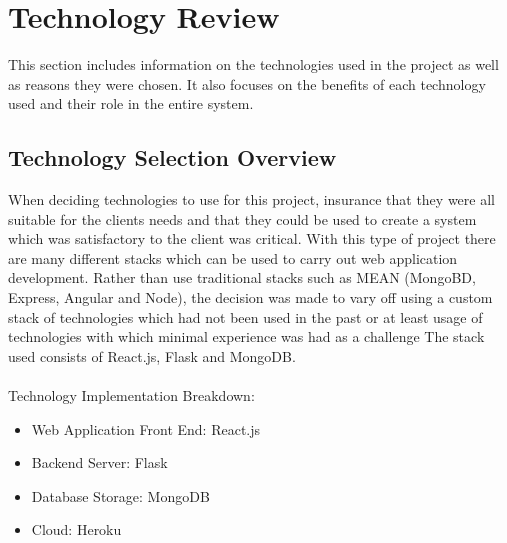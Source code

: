 \chapter{Technology Review}
This section includes information on the technologies used in the project as well as reasons they were chosen. It also focuses on the benefits of each technology used and their role in the entire system.

\section{Technology Selection Overview}
When deciding technologies to use for this project, insurance that they were all suitable for the clients needs and that they could be used to create a system which was satisfactory to the client was critical. With this type of project there are many different stacks which can be used to carry out web application development. Rather than use traditional stacks such as MEAN (MongoBD, Express, Angular and Node), the decision was made to vary off using a custom stack of technologies which had not been used in the past or at least usage of technologies with which minimal experience was had as a challenge The stack used consists of React.js, Flask and MongoDB. \\ \\
Technology Implementation Breakdown:
\begin{itemize}
    \item Web Application Front End: React.js
    \item Backend Server: Flask
    \item Database Storage: MongoDB
    \item Cloud: Heroku
\end{itemize}
\newpage

